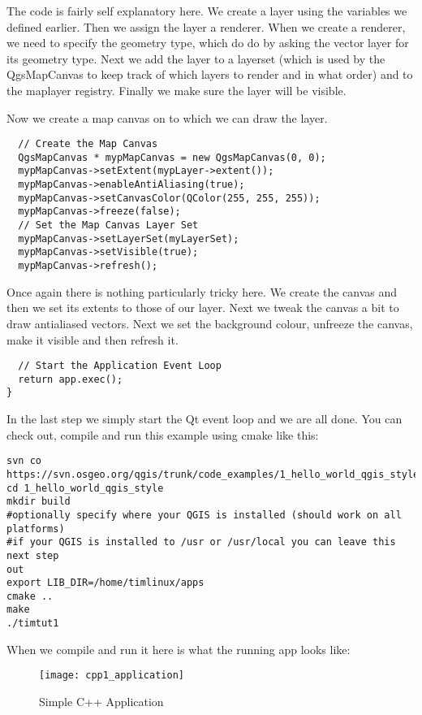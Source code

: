 The code is fairly self explanatory here. We create a layer using the
variables
we defined earlier. Then we assign the layer a renderer. When we create a
renderer, we need to specify the geometry type, which do do by asking the
vector layer for its geometry type. Next we add the layer to a layerset
(which
is used by the QgsMapCanvas to keep track of which layers to render and in
what
order) and to the maplayer registry. Finally we make sure the layer will be
visible.

Now we create a map canvas on to which we can draw the layer.

\begin{verbatim}
  // Create the Map Canvas
  QgsMapCanvas * mypMapCanvas = new QgsMapCanvas(0, 0);
  mypMapCanvas->setExtent(mypLayer->extent());
  mypMapCanvas->enableAntiAliasing(true);
  mypMapCanvas->setCanvasColor(QColor(255, 255, 255));
  mypMapCanvas->freeze(false);
  // Set the Map Canvas Layer Set
  mypMapCanvas->setLayerSet(myLayerSet);
  mypMapCanvas->setVisible(true);
  mypMapCanvas->refresh();

\end{verbatim}

Once again there is nothing particularly tricky here. We create the canvas
and then we set its extents to those of our layer. Next we tweak the canvas a bit
to draw antialiased vectors. Next we set the background colour, unfreeze the
canvas, make it visible and then refresh it.

\begin{verbatim}
  // Start the Application Event Loop
  return app.exec();
}

\end{verbatim}

In the last step we simply start the Qt event loop and we are all done. You
can check out, compile and run this example using cmake like this:

\begin{verbatim}
svn co
https://svn.osgeo.org/qgis/trunk/code_examples/1_hello_world_qgis_style
cd 1_hello_world_qgis_style
mkdir build
#optionally specify where your QGIS is installed (should work on all
platforms)
#if your QGIS is installed to /usr or /usr/local you can leave this next step
out
export LIB_DIR=/home/timlinux/apps
cmake ..
make
./timtut1
\end{verbatim}

When we compile and run it here is what the running app looks like:

\begin{figure}[ht]
   \begin{center}
   \caption{Simple C++ Application \osxcaption}\label{fig:cpp1_application}\smallskip
   \texttt{[image: cpp1\_application]}
\end{center}
\end{figure}

